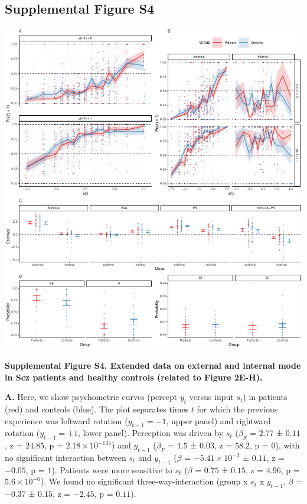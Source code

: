 \documentclass[
]{article}
\begin{document}
\newpage

\subsection{Supplemental Figure S4}\label{supplemental-figure-s4}

\includegraphics{modes_ketamine_scz_files/figure-latex/Supplemental_Figure_S4-1.pdf}

\textbf{Supplemental Figure S4. Extended data on external and internal
mode in Scz patients and healthy controls (related to Figure 2E-H).}

\textbf{A.} Here, we show psychometric curves (percept \(y_t\) versus
input \(s_t\)) in patients (red) and controls (blue). The plot separates
times \(t\) for which the previous experience was leftward rotation
(\(y_{t-1} = -1\), upper panel) and rightward rotation
(\(y_{t-1} = +1\), lower panel). Perception was driven by \(s_t\)
(\(\beta_S\) = \(2.77\) ± \(0.11\), z = \(24.85\), p =
\(\ensuremath{2.18\times 10^{-135}}\)) and \(y_{t-1}\) (\(\beta_{P}\) =
\(1.5\) ± \(0.03\), z = \(58.2\), p = \(0\)), with no significant
interaction between \(s_t\) and \(y_{t-1}\) (\(\beta\) =
\(\ensuremath{-5.41\times 10^{-3}}\) ± \(0.11\), z = \(-0.05\), p =
\(1\)). Patients were more sensitive to \(s_t\) (\(\beta\) = \(0.75\) ±
\(0.15\), z = \(4.96\), p = \(\ensuremath{5.6\times 10^{-6}}\)). We
found no significant three-way-interaction (group x \(s_t\) x
\(y_{t-1}\), \(\beta\) = \(-0.37\) ± \(0.15\), z = \(-2.45\), p =
\(0.11\)).
\end{document}
